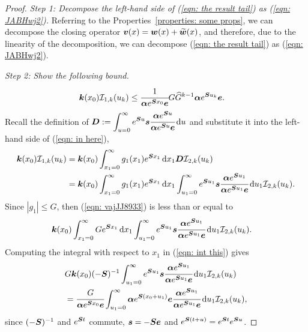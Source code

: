 \begin{proof}
	\emph{Step 1: Decompose the left-hand side of (\ref{eqn: the result tail}) as (\ref{eqn: JABHwj2}).}
		Referring to the Properties~\ref{properties: some props}, we can decompose the closing operator \(\boldsymbol v(x)=\boldsymbol w(x) + \widetilde{\boldsymbol w}(x)\), and therefore, due to the linearity of the decomposition, we can decompose (\ref{eqn: the result tail}) as (\ref{eqn: JABHwj2}).

	\emph{Step 2: Show the following bound.}
	\begin{align}
		\boldsymbol k(x_0)\mathcal I_{1,k}(u_k) 
            	&\leq \cfrac{1}{\boldsymbol \alpha e^{\boldsymbol{S}x_0}\boldsymbol e}G\widehat G^{k-1} \boldsymbol \alpha e^{\boldsymbol{S}u_k}\boldsymbol e.\label{eqn: in here}
	\end{align}
	Recall the definition of \(\boldsymbol{D}:=\displaystyle\int_{u=0}^\infty e^{\boldsymbol{S}u}\boldsymbol s \cfrac{\boldsymbol \alpha e^{\boldsymbol{S}u}}{\boldsymbol \alpha e^{\boldsymbol{S}u}\boldsymbol e}\, \mathrm{d} u\) and substitute it into the left-hand side of (\ref{eqn: in here}), 
	\begin{align}
		\boldsymbol k(x_0) \mathcal I_{1,k}(u_k) &=\boldsymbol k(x_0) \int_{x_1=0}^\infty g_1(x_1) e^{\boldsymbol{S}x_1} \, \mathrm{d} x_1 \boldsymbol{D} \mathcal I_{2,k}(u_k) \nonumber 
		\\&=\boldsymbol k(x_0)\int_{x_1=0}^\infty g_1(x_1) e^{\boldsymbol{S}x_1} \, \mathrm{d} x_1 \int_{u_1=0}^\infty e^{\boldsymbol{S}u_1}\boldsymbol s \cfrac{\boldsymbol \alpha e^{\boldsymbol{S}u_1}}{\boldsymbol \alpha e^{\boldsymbol{S}u_1}\boldsymbol e}\, \mathrm{d} u_1 \mathcal I_{2,k}(u_k). \label{eqn: vajJJ8933}
	\end{align}
	Since \(|g_1|\leq G\), then (\ref{eqn: vajJJ8933}) is less than or equal to
	\begin{align}
		&\boldsymbol k(x_0) \int_{x_1=0}^\infty G  e^{\boldsymbol{S}x_1} \, \mathrm{d} x_1 \int_{u_1=0}^\infty e^{\boldsymbol{S}u_1}\boldsymbol s \cfrac{\boldsymbol \alpha e^{\boldsymbol{S}u_1}}{\boldsymbol \alpha e^{\boldsymbol{S}u_1}\boldsymbol e}\, \mathrm{d} u_1 \mathcal I_{2,k}(u_k).\label{eqn: int this}
	\end{align}
	Computing the integral with respect to \(x_1\) in (\ref{eqn: int this}) gives 
	\begin{align}
		 &G  \boldsymbol k(x_0)(-\boldsymbol{S})^{-1} \int_{u_1=0}^\infty e^{\boldsymbol{S}u_1}\boldsymbol s \cfrac{\boldsymbol \alpha e^{\boldsymbol{S}u_1}}{\boldsymbol \alpha e^{\boldsymbol{S}u_1}\boldsymbol e}\, \mathrm{d} u_1 \mathcal I_{2,k}(u_k)  \nonumber
		\\&=\cfrac{G}{\boldsymbol \alpha e^{\boldsymbol{S}x_0}\boldsymbol e} \int_{u_1=0}^\infty \boldsymbol \alpha e^{\boldsymbol{S}(x_0+u_1)}\boldsymbol e \cfrac{\boldsymbol \alpha e^{\boldsymbol{S}u_1}}{\boldsymbol \alpha e^{\boldsymbol{S}u_1}\boldsymbol e}\, \mathrm{d} u_1\mathcal I_{2,k}(u_k), \label{eqn: yet another label}
	\end{align}
	since \((-\boldsymbol{S})^{-1}\) and \(e^{\boldsymbol{S}t}\) commute, \(\boldsymbol s = - \boldsymbol{S} \boldsymbol e \) and \(e^{\boldsymbol{S}(t+u)} = e^{\boldsymbol{S}t}e^{\boldsymbol{S}u}\). 

\end{proof}
